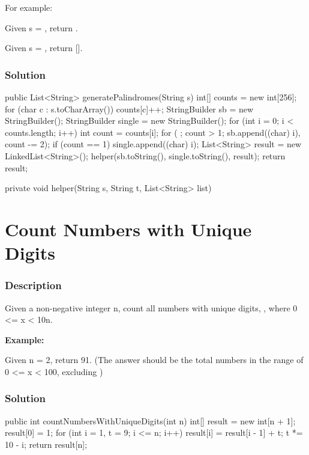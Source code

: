 For example:

Given s = , return .

Given s = , return [].

\subsubsection{Solution}
\begin{Code}
public List<String> generatePalindromes(String s) {
    int[] counts = new int[256];
    for (char c : s.toCharArray()) {
        counts[c]++;
    }
    StringBuilder sb = new StringBuilder();
    StringBuilder single = new StringBuilder();
    for (int i = 0; i < counts.length; i++) {
        int count = counts[i];
        for ( ; count > 1; sb.append((char) i), count -= 2);
        if (count == 1) {
            single.append((char) i);
        }
    }
    List<String> result = new LinkedList<String>();
    helper(sb.toString(), single.toString(), result);
    return result;
}

private void helper(String s, String t, List<String> list) {

}
\end{Code}

\newpage

\section{Count Numbers with Unique Digits} %

\subsubsection{Description}

Given a non-negative integer n, count all numbers with unique digits, , where 0 <= x < 10n.

\textbf{Example:}

Given n = 2, return 91. (The answer should be the total numbers in the range of 0 <= x < 100, excluding \code{[11,22,33,44,55,66,77,88,99]})

\subsubsection{Solution}

\begin{Code}
public int countNumbersWithUniqueDigits(int n) {
    int[] result = new int[n + 1];
    result[0] = 1;
    for (int i = 1, t = 9; i <= n; i++) {
        result[i] = result[i - 1] + t;
        t *= 10 - i;
    }
    return result[n];
}
\end{Code}

